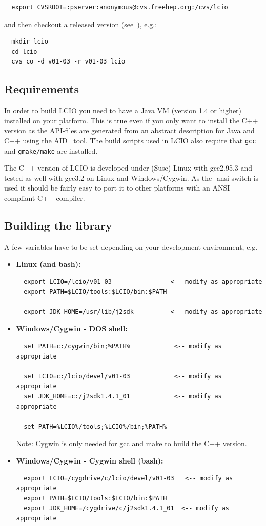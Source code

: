 \documentclass[twoside]{article}
\begin{document}
\begin{verbatim}
  export CVSROOT=:pserver:anonymous@cvs.freehep.org:/cvs/lcio
\end{verbatim}

and then checkout a released version (see~\cite{lcio_home}), e.g.:
\begin{verbatim}
  mkdir lcio 
  cd lcio
  cvs co -d v01-03 -r v01-03 lcio
\end{verbatim}

\subsection{Requirements}
In order to build LCIO you need to have a Java VM (version 1.4 or higher) installed 
on your platform. This is true even if you only want to install the C++ version as the 
API-files are generated from an abstract description for Java and C++ using the 
AID~\cite{ref_aid} tool. The build scripts used in LCIO also require that \verb$gcc$ and 
\verb$gmake/make$ are installed.

The C++ version of LCIO is developed under (Suse) Linux with gcc2.95.3 and tested
as well with gcc3.2 on Linux and Windows/Cygwin. 
As the -ansi switch is used it should be fairly easy to port it to other platforms with
an ANSI compliant C++ compiler.

\subsection {Building the library}

A few variables have to be set depending on your development environment, e.g.
\begin{itemize}
\item{ {\bf Linux (and bash):} 
\begin{verbatim} 
  export LCIO=/lcio/v01-03                <-- modify as appropriate
  export PATH=$LCIO/tools:$LCIO/bin:$PATH

  export JDK_HOME=/usr/lib/j2sdk          <-- modify as appropriate
\end{verbatim} 
}
\item{ {\bf Windows/Cygwin - DOS shell:} 
\begin{verbatim}
  set PATH=c:/cygwin/bin;%PATH%            <-- modify as appropriate

  set LCIO=c:/lcio/devel/v01-03            <-- modify as appropriate
  set JDK_HOME=c:/j2sdk1.4.1_01            <-- modify as appropriate 

  set PATH=%LCIO%/tools;%LCIO%/bin;%PATH%
\end{verbatim}
Note: Cygwin is only needed for gcc and make to build the C++ version.
}
\item{ {\bf Windows/Cygwin - Cygwin shell (bash):} 
\begin{verbatim}
  export LCIO=/cygdrive/c/lcio/devel/v01-03   <-- modify as appropriate
  export PATH=$LCIO/tools:$LCIO/bin:$PATH
  export JDK_HOME=/cygdrive/c/j2sdk1.4.1_01  <-- modify as appropriate
\end{verbatim} %
}
\end{itemize}
\end{document}

